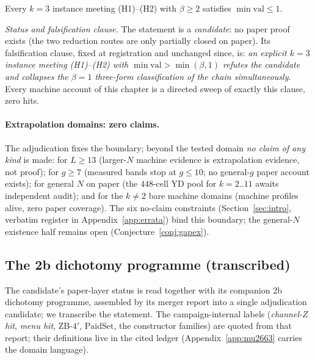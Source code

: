 \begin{conjecture}\label{prop:2663cand}
Every $k=3$ instance meeting (H1)--(H2) with $\beta\ge 2$ satisfies
$\min\mathrm{val}\le 1$.
\end{conjecture}

\emph{Status and falsification clause.} The statement is a
\emph{candidate}: no paper proof exists (the two reduction routes are
only partially closed on paper). Its falsification
clause, fixed at registration and unchanged since, is:
\emph{an explicit $k=3$ instance meeting (H1)--(H2) with
$\min\mathrm{val}>\min(\beta,1)$ refutes the candidate and collapses the
$\beta=1$ three-form classification of the chain simultaneously}. Every
machine account of this chapter is a directed sweep of exactly this clause, zero hits.

\paragraph{Extrapolation domains: zero claims.} The adjudication fixes the boundary;
beyond the tested domain \emph{no claim of any kind} is made: for $L\ge13$ (larger-$N$
machine evidence is extrapolation evidence, not proof); for $g\ge7$ (measured bands stop
at $g\le10$; no general-$g$ paper account exists); for general $N$ on paper (the $448$-cell
YD pool for $k=2..11$ awaits independent audit); and for the $k\ne2$ bare machine domains
(machine profiles alive, zero paper coverage). The six no-claim constraints
(Section~\ref{sec:intro}, verbatim register in Appendix~\ref{app:errata}) bind this
boundary; the general-$N$ existence half remains open
(Conjecture~\ref{conj:gapex}).

\subsection{The 2b dichotomy programme (transcribed)}\label{subsec:twob}

The candidate's paper-layer status is read together with its companion 2b
dichotomy programme, assembled by its merger report into a single adjudication
candidate; we transcribe the statement. The campaign-internal labels
(\emph{channel-$Z$ hit}, \emph{menu hit}, $\mathrm{ZB}\text{-}4'$,
$\mathrm{PaidSet}$, the constructor families) are quoted from that report;
their definitions live in the cited ledger (Appendix~\ref{app:mu2663} carries
the domain language).

